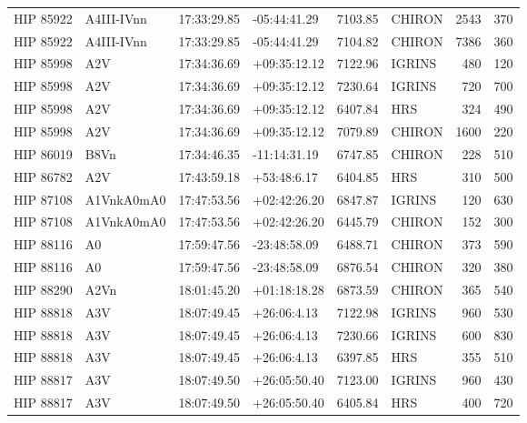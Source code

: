 \documentclass{emulateapj}
\begin{document}
\begin{longtable*}{|l|lllrlrr|}
   HIP 85922 &     A4III-IVnn &    17:33:29.85 &   -05:44:41.29 &  7103.85 &     CHIRON &     2543 &     370 \\
   HIP 85922 &     A4III-IVnn &    17:33:29.85 &   -05:44:41.29 &  7104.82 &     CHIRON &     7386 &     360 \\
   HIP 85998 &            A2V &    17:34:36.69 &   +09:35:12.12 &  7122.96 &     IGRINS &      480 &     120 \\
   HIP 85998 &            A2V &    17:34:36.69 &   +09:35:12.12 &  7230.64 &     IGRINS &      720 &     700 \\
   HIP 85998 &            A2V &    17:34:36.69 &   +09:35:12.12 &  6407.84 &        HRS &      324 &     490 \\
   HIP 85998 &            A2V &    17:34:36.69 &   +09:35:12.12 &  7079.89 &     CHIRON &     1600 &     220 \\
   HIP 86019 &           B8Vn &    17:34:46.35 &   -11:14:31.19 &  6747.85 &     CHIRON &      228 &     510 \\
   HIP 86782 &            A2V &    17:43:59.18 &    +53:48:6.17 &  6404.85 &        HRS &      310 &     500 \\
   HIP 87108 &     A1VnkA0mA0 &    17:47:53.56 &   +02:42:26.20 &  6847.87 &     IGRINS &      120 &     630 \\
   HIP 87108 &     A1VnkA0mA0 &    17:47:53.56 &   +02:42:26.20 &  6445.79 &     CHIRON &      152 &     300 \\
   HIP 88116 &             A0 &    17:59:47.56 &   -23:48:58.09 &  6488.71 &     CHIRON &      373 &     590 \\
   HIP 88116 &             A0 &    17:59:47.56 &   -23:48:58.09 &  6876.54 &     CHIRON &      320 &     380 \\
   HIP 88290 &           A2Vn &    18:01:45.20 &   +01:18:18.28 &  6873.59 &     CHIRON &      365 &     540 \\
   HIP 88818 &            A3V &    18:07:49.45 &    +26:06:4.13 &  7122.98 &     IGRINS &      960 &     530 \\
   HIP 88818 &            A3V &    18:07:49.45 &    +26:06:4.13 &  7230.66 &     IGRINS &      600 &     830 \\
   HIP 88818 &            A3V &    18:07:49.45 &    +26:06:4.13 &  6397.85 &        HRS &      355 &     510 \\
   HIP 88817 &            A3V &    18:07:49.50 &   +26:05:50.40 &  7123.00 &     IGRINS &      960 &     430 \\
   HIP 88817 &            A3V &    18:07:49.50 &   +26:05:50.40 &  6405.84 &        HRS &      400 &     720 \\

\end{longtable*}
\end{document}

